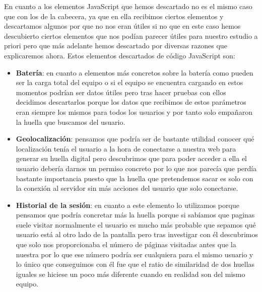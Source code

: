En cuanto a los elementos JavaScript que hemos descartado no es el mismo caso que con los de la cabecera, ya que en ella recibimos ciertos elementos y descartamos algunos por que no nos eran útiles si no que en este caso hemos descubierto ciertos elementos que nos podían parecer útiles para nuestro estudio a priori pero que más adelante hemos descartado por diversas razones que explicaremos ahora. Estos elementos descartados de código JavaScript son:
\begin{itemize}
    \item \textbf{Batería}: en cuanto a elementos más concretos sobre la batería como pueden ser la carga total del equipo o si el equipo se encuentra cargando en estos momentos podrían ser datos útiles pero tras hacer pruebas con ellos decidimos descartarlos porque los datos que recibimos de estos parámetros eran siempre los mismos para todos los usuarios y por tanto solo empañaron la huella que buscamos del usuario.
    \item \textbf{Geolocalización}: pensamos que podría ser de bastante utilidad conocer qué localización tenía el usuario a la hora de conectarse a nuestra web para generar su huella digital pero descubrimos que para poder acceder a ella el usuario debería darnos un permiso concreto por lo que nos parecía que perdía bastante importancia puesto que la huella que pretendemos sacar es solo con la conexión al servidor sin más acciones del usuario que solo conectarse.
    \item \textbf{Historial de la sesión}: en cuanto a este elemento lo utilizamos porque pensamos que podría concretar más la huella porque si sabíamos que paginas suele visitar normalmente el usuario es mucho más probable que sepamos qué usuario está al otro lado de la pantalla pero tras investigar con él descubrimos que solo nos proporcionaba el número de páginas visitadas antes que la nuestra por lo que ese número podría ser cualquiera para el mismo usuario y lo único que conseguimos con él fue que el ratio de similaridad de dos huellas iguales se hiciese un poco más diferente cuando en realidad son del mismo equipo.
\end{itemize}